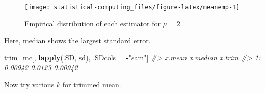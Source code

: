 \documentclass[]{book}
\newenvironment{Shaded}{\begin{snugshade}}{\end{snugshade}}
\newcommand{\CommentTok}[1]{\textcolor[rgb]{0.56,0.35,0.01}{\textit{#1}}}
\newcommand{\ControlFlowTok}[1]{\textcolor[rgb]{0.13,0.29,0.53}{\textbf{#1}}}
\newcommand{\DataTypeTok}[1]{\textcolor[rgb]{0.13,0.29,0.53}{#1}}
\newcommand{\DecValTok}[1]{\textcolor[rgb]{0.00,0.00,0.81}{#1}}
\newcommand{\KeywordTok}[1]{\textcolor[rgb]{0.13,0.29,0.53}{\textbf{#1}}}
\newcommand{\NormalTok}[1]{#1}
\newcommand{\OperatorTok}[1]{\textcolor[rgb]{0.81,0.36,0.00}{\textbf{#1}}}
\newcommand{\StringTok}[1]{\textcolor[rgb]{0.31,0.60,0.02}{#1}}
\theoremstyle{definition}
\theoremstyle{definition}
\theoremstyle{definition}
\theoremstyle{remark}
\begin{document}
\begin{figure}[H]

{\centering \texttt{[image: statistical-computing\_files/figure-latex/meanemp-1]} 

}

\caption{Empirical distribution of each estimator for $\mu = 2$}\label{fig:meanemp}
\end{figure}

Here, median shows the largest standard error.

\begin{Shaded}
\begin{Highlighting}[]
\NormalTok{trim_mc[,}
        \KeywordTok{lapply}\NormalTok{(.SD, sd),}
\NormalTok{        .SDcols =}\StringTok{ }\OperatorTok{-}\StringTok{"sam"}\NormalTok{]}
\CommentTok{#>     x.mean x.median  x.trim}
\CommentTok{#> 1: 0.00942   0.0123 0.00942}
\end{Highlighting}
\end{Shaded}

Now try various \(k\) for trimmed mean.

\begin{Shaded}
\end{Shaded}
\end{document}
